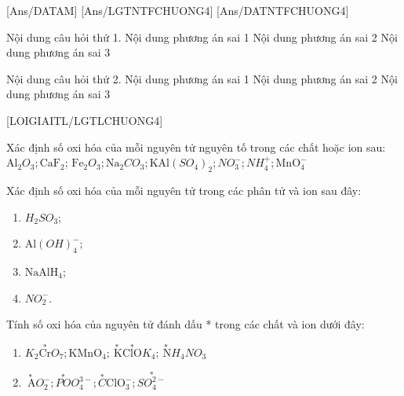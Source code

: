 [Ans/DATAM]
\luulgEXTF
{}[Ans/LGTNTFCHUONG4]
[Ans/DATNTFCHUONG4]
\begin{ex}
	Nội dung câu hỏi thứ 1.
	{Nội dung phương án sai 1}
	{\True Nội dung phương án sai 2}
	{Nội dung phương án sai 3}
\end{ex}
\begin{ex}
	Nội dung câu hỏi thứ 2.
	{Nội dung phương án sai 1}
	{ \True Nội dung phương án sai 2}
	{\True Nội dung phương án sai 3}
\end{ex}
[LOIGIAITL/LGTLCHUONG4]
\luuloigiaibt
\begin{bt}
	Xác định số oxi hóa của mỗi nguyên tử nguyên tố trong các chất hoặc ion sau: $\mathrm{Al}_2O_3; \mathrm{CaF}_2$; $\mathrm{Fe}_2O_3; \mathrm{Na}_2CO_3; \mathrm{KAl}\left(SO_4\right)_2; NO_3^{-}; NH_4^{+}; \mathrm{MnO}_4^{-}$
\end{bt}

\begin{bt}
	Xác định số oxi hóa của mỗi nguyên tử trong các phân tử và ion sau đây:
	\begin{enumerate}
		\item $H_2SO_3$;
		\item $\mathrm{Al}(OH)_4^{-}$;
		\item $\mathrm{NaAlH}_4$;
		\item $NO_2^{-}$.
	\end{enumerate}
\end{bt}

\begin{bt}
	Tính số oxi hóa của nguyên tử đánh dấu * trong các chất và ion dưới đây:
	\begin{enumerate}
		\item $K_2\stackrel{*}{\mathrm{Cr}} O_7; \mathrm{KMnO}_4; \stackrel{*}{\mathrm{~K}} \stackrel{*}{\mathrm{ClO}} K_4; \stackrel{*}{\mathrm{~N}} H_4NO_3$
		\item $\stackrel{*}{\mathrm{~A}} O_2^{-}; \stackrel{*}{PO} O_4^{3-}; \stackrel{*}{C} \mathrm{ClO}_3^{-}; \stackrel{*}{SO_4^{2-}}$
	\end{enumerate}
\end{bt}

